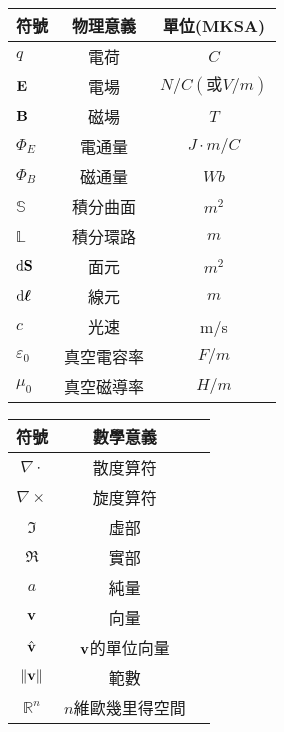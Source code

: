 \begin{table}[!htbp]
    \centering
    \begin{tabular}{lcc}
        \toprule
        符號             & 物理意義   & 單位(MKSA)           \\
        \midrule
        $q$              & 電荷       & $\unit{C}$           \\
        $\mathbf{E}$         & 電場       & $\unit{N/C(或V/m)}$  \\
        $\mathbf{B}$         & 磁場       & $\unit{T}$           \\
        $\Phi_E$         & 電通量     & $\unit{J\cdot m /C}$ \\
        $\Phi_B$         & 磁通量     & $\unit{Wb}$          \\
        $\mathbb{S}$     & 積分曲面   & $\unit{m^2}$         \\
        $\mathbb{L}$     & 積分環路   & $\unit{m}$           \\
        $\mathop{}\!\mathrm{d} \mathbf{S}$    & 面元       & $\unit{m^2}$         \\
        $\mathop{}\!\mathrm{d} \bm{\ell}$ & 線元       & $\unit{m}$           \\
        $c$              & 光速       & m/s                  \\
        $\varepsilon_0$  & 真空電容率 & $\unit{F/m}$         \\
        $\mu_0$          & 真空磁導率 & $\unit{H/m}$         \\
        \bottomrule
    \end{tabular}
\end{table}

\begin{table}[!htbp]
    \centering
    \begin{tabular}{ccc}
        \toprule
        符號            & 數學意義           \\
        \midrule
        $\nabla \cdot$  & 散度算符           \\
        $\nabla \times$ & 旋度算符           \\
        $\Im$           & 虛部               \\
        $\Re$           & 實部               \\
        $a$             & 純量               \\
        $\mathbf{v}$        & 向量               \\
        $\hat{\mathbf{v}}$        & $\mathbf{v}$的單位向量 \\
        $\left\|\mathbf{v}\right\|$ & 範數               \\
        $\mathbb{R}^n$  & $n$維歐幾里得空間  \\
        \bottomrule
    \end{tabular}
\end{table}
